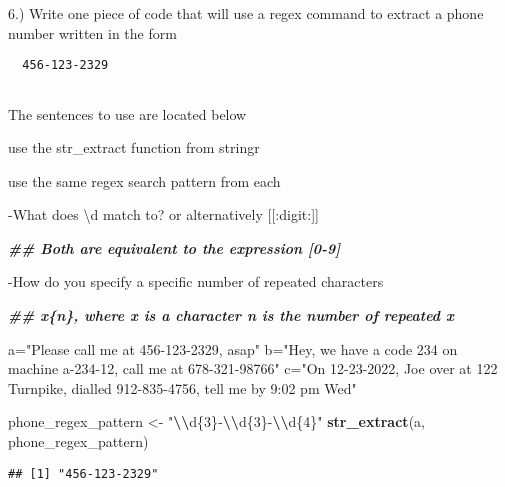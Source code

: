 \documentclass[
]{article}
\newenvironment{Shaded}{\begin{snugshade}}{\end{snugshade}}
\newcommand{\DocumentationTok}[1]{\textcolor[rgb]{0.56,0.35,0.01}{\textbf{\textit{#1}}}}
\newcommand{\FunctionTok}[1]{\textcolor[rgb]{0.13,0.29,0.53}{\textbf{#1}}}
\newcommand{\NormalTok}[1]{#1}
\newcommand{\OtherTok}[1]{\textcolor[rgb]{0.56,0.35,0.01}{#1}}
\newcommand{\SpecialCharTok}[1]{\textcolor[rgb]{0.81,0.36,0.00}{\textbf{#1}}}
\newcommand{\StringTok}[1]{\textcolor[rgb]{0.31,0.60,0.02}{#1}}
\begin{document}
6.) Write one piece of code that will use a regex command to extract a
phone number written in the form

\begin{verbatim}
  456-123-2329
  
\end{verbatim}

The sentences to use are located below

use the str\_extract function from stringr

use the same regex search pattern from each

-What does \textbackslash d match to? or alternatively
{[}{[}:digit:{]}{]}

\begin{Shaded}
\begin{Highlighting}[]
\DocumentationTok{\#\# Both are equivalent to the expression [0{-}9]}
\end{Highlighting}
\end{Shaded}

-How do you specify a specific number of repeated characters

\begin{Shaded}
\begin{Highlighting}[]
\DocumentationTok{\#\# x\{n\}, where x is a character n is the number of repeated x}
\end{Highlighting}
\end{Shaded}

\begin{Shaded}
\begin{Highlighting}[]
\NormalTok{a}\OtherTok{=}\StringTok{"Please call me at 456{-}123{-}2329, asap"}
\NormalTok{b}\OtherTok{=}\StringTok{"Hey, we have a code 234 on machine a{-}234{-}12, call me at 678{-}321{-}98766"}
\NormalTok{c}\OtherTok{=}\StringTok{"On 12{-}23{-}2022, Joe over at 122 Turnpike, dialled 912{-}835{-}4756, tell me by 9:02 pm Wed"}

\NormalTok{phone\_regex\_pattern }\OtherTok{\textless{}{-}} \StringTok{"}\SpecialCharTok{\textbackslash{}\textbackslash{}}\StringTok{d\{3\}{-}}\SpecialCharTok{\textbackslash{}\textbackslash{}}\StringTok{d\{3\}{-}}\SpecialCharTok{\textbackslash{}\textbackslash{}}\StringTok{d\{4\}"}
\FunctionTok{str\_extract}\NormalTok{(a, phone\_regex\_pattern)}
\end{Highlighting}
\end{Shaded}

\begin{verbatim}
## [1] "456-123-2329"
\end{verbatim}
\end{document}
